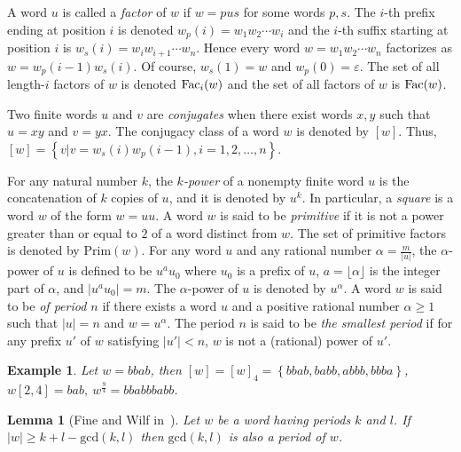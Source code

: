 \documentclass[runningheads,envcountsame,a4paper]{llncs}
\newtheorem{lem}[thm]{Lemma}
\newtheorem{exa}[thm]{Example}
\newcommand{\fac}{\hbox{\rm Fac}}
\newcommand{\pri}{\mathrm{Prim}}
\begin{document}
A word $u$ is called a {\em factor} of $w$ if $w = pus$ for some words $p,s$. The $i$-th prefix ending at position $i$ is denoted $w_p(i) =w_1w_2 \cdots w_{i}$ and the  $i$-th suffix starting at position $i$ is $w_{s}(i)=w_iw_{i+1} \cdots w_{n}$. Hence every word $w=w_1w_2 \cdots w_n$ factorizes as $w= w_p(i-1) w_{s}(i)$. Of course, $w_s(1)=w$ and $w_p(0)=\varepsilon$. The set of all length-$i$ factors of $w$ is denoted  $\fac_i(w)$ and the set of all factors of $w$ is $\fac(w)$. 

Two finite words $u$ and $v$ are {\em conjugates} when there exist words $x,y$ such that $u=xy$ and $v=yx$. The conjugacy class of a word $w$ is denoted by $[w]$. 
Thus, $[w]=\left\{v|v=w_s(i)w_p(i-1), i=1,2,\ldots, n\right\}$.

For any natural number $k$,  the {\em $k$-power} of a nonempty finite word $u$ is the concatenation of $k$ copies of $u$, and it is denoted by $u^k$. In particular, a \emph{square} is a word $w$ of the form $w=uu$. 
A word $w$ is said to be {\em primitive} if it is not a power greater than or equal to $2$ of a word distinct from $w$. The set of primitive factors is denoted by $\pri(w)$. For any word $u$ and any rational number $\alpha=\frac{m}{|u|}$, the $\alpha$-power of $u$ is defined to be $u^au_0$ where $u_0$ is a prefix of $u$, $a=\lfloor \alpha \rfloor$ is the integer part of $\alpha$, and $|u^au_0|=m$. The $\alpha$-power of $u$ is denoted by $u^{\alpha}$. A word $w$ is said to be {\em of period $n$} if there exists a word $u$ and a positive rational number $\alpha \geq 1$ such that $|u|=n$ and $w=u^{\alpha}$. The period $n$ is said to be {\em the smallest period} if for any prefix $u'$ of $w$ satisfying $|u'|<n$, $w$ is not a (rational) power of $u'$.

\begin{exa}{\rm 
Let $w=bbab$, then $[w]=[w]_4=\left\{bbab,babb,abbb,bbba\right\}$,\\ 
$w[2,4]=bab,\ w^{\frac94}=bbabbbabb$.}
\end{exa}

\begin{lem}[{\rm Fine and Wilf in~\cite{fiwi}}]
\label{Fine}
Let $w$ be a word having periods $k$ and $l$. If $|w|\ge k+l-\mathrm{gcd}(k,l)$ then $\mathrm{gcd}(k,l)$ is also a period of $w$.    
\end{lem}
\end{document}
